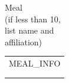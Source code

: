 \documentclass{article}
\begin{document}
\vspace{1cm}
\noindent
\begin{minipage}{0.15\textwidth}
    \vspace{-0.3cm} %
    \small
    Meal\\ %
    (if less than 10,\\         %
    list name and\\
    affiliation)
\end{minipage}%
\begin{minipage}{0.7\textwidth}
    \begin{tabular}{|p{\textwidth}|}
        \hline
        \normalsize {{MEAL\_INFO}}\\ %
        \\
        \\
        \hline
    \end{tabular}
\end{minipage}

\vspace{1cm}
\end{document}
